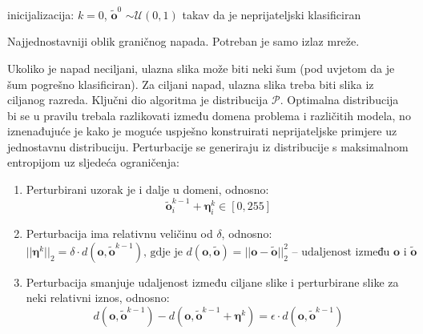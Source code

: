 \documentclass[utf8, diplomski]{fer}
\begin{document}
\begin{center}
\begin{algorithm}[H]
 inicijalizacija: $k=0$, $\boldsymbol{\tilde{o}}^{0}$ $\sim \mathcal{U}(0, 1)$ takav da je neprijateljski klasificiran\;
 \caption{Najjednostavniji oblik graničnog napada. Potreban je samo izlaz mreže.}\label{simple_boundary_alg}
\end{algorithm}
\end{center}
\par
Ukoliko je napad neciljani, ulazna slika može biti neki šum (pod uvjetom da je šum pogrešno klasificiran). Za ciljani napad, ulazna slika treba biti slika iz ciljanog razreda. Ključni dio algoritma je distribucija $\mathcal{P}$. Optimalna distribucija bi se u pravilu trebala razlikovati između domena problema i različitih modela, no iznenađujuće je kako je moguće uspješno konstruirati neprijateljske primjere uz jednostavnu distribuciju. Perturbacije se generiraju iz distribucije s maksimalnom entropijom uz sljedeća ograničenja:
\begin{enumerate}
  \item Perturbirani uzorak je i dalje u domeni, odnosno:
  \begin{equation}\label{boundary_1_cond}
	\boldsymbol{\tilde{o}}_{i}^{k-1} + \boldsymbol{\eta}_{i}^{k} \in [0, 255]
	\end{equation}
  \item Perturbacija ima relativnu veličinu od $\delta$, odnosno:
    \begin{equation}\label{boundary_2_cond}
	||\boldsymbol{\eta}^{k}||_{2} = \delta \cdot d(\boldsymbol{o}, \boldsymbol{\tilde{o}}^{k-1})\text{, gdje je }d(\boldsymbol{o}, \boldsymbol{\tilde{o}}) = ||\boldsymbol{o} - \boldsymbol{\tilde{o}}||_{2}^{2} \text{ -- udaljenost između }\boldsymbol{o}\text{ i } \boldsymbol{\tilde{o}}
	\end{equation}
	\item Perturbacija smanjuje udaljenost između ciljane slike i perturbirane slike za neki relativni iznos, odnosno:
    \begin{equation}\label{boundary_3_cond}
	d(\boldsymbol{o}, \boldsymbol{\tilde{o}}^{k-1}) - d(\boldsymbol{o}, \boldsymbol{\tilde{o}}^{k-1} + \boldsymbol{\eta}^{k}) = \epsilon \cdot d(\boldsymbol{o}, \boldsymbol{\tilde{o}}^{k-1})
	\end{equation}
\end{enumerate}
\end{document}
